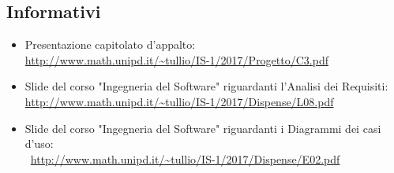 \documentclass[./AnalisideiRequisiti.tex]{subfiles}
\begin{document}
\subsection*{Informativi}
\begin{itemize}
	\item Presentazione capitolato d'appalto: \\ \url{http://www.math.unipd.it/~tullio/IS-1/2017/Progetto/C3.pdf}
	\item Slide del corso "Ingegneria del Software" riguardanti l'Analisi dei Requisiti: \\ \url{http://www.math.unipd.it/~tullio/IS-1/2017/Dispense/L08.pdf}
	\item Slide del corso "Ingegneria del Software" riguardanti i Diagrammi dei casi d'uso: \\\ \url{http://www.math.unipd.it/~tullio/IS-1/2017/Dispense/E02.pdf}
\end{itemize}
\end{document}
